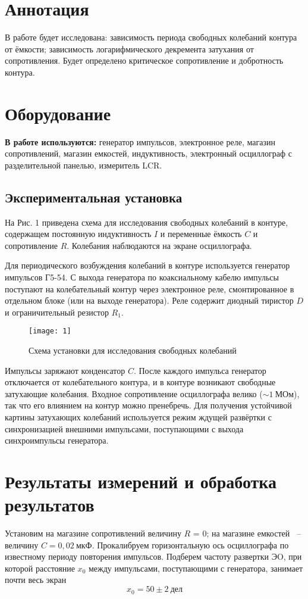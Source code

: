  


\section{Аннотация}
В работе будет исследована: зависимость
периода свободных колебаний контура от
ёмкости; зависимость логарифмического
декремента затухания от сопротивления.
Будет определено критическое
сопротивление и добротность контура.
\section{Оборудование}
\textbf{В работе используются:} генератор импульсов, электронное реле, магазин сопротивлений,
магазин емкостей, индуктивность, электронный осциллограф с разделительной панелью, измеритель
LCR.
\subsection*{Экспериментальная установка}
На Рис. 1 приведена схема для исследования свободных колебаний в контуре, содержащем постоянную
индуктивность $I$ и переменные ёмкость $C$ и сопротивление $R$. Колебания наблюдаются на экране
осциллографа.

Для периодического возбуждения колебаний в контуре используется генератор импульсов Г5-54. С выхода
генератора по коаксиальному кабелю импульсы поступают на колебательный контур через электронное
реле, смонтированное в отдельном блоке (или на выходе генератора). Реле содержит диодный тиристор
$D$ и ограничительный резистор $R_1$.
\begin{figure}[H]
    \texttt{[image: 1]}
    \captionsetup{justification =
    centering}
    \caption{Схема установки для
    исследования свободных колебаний}
\end{figure}
Импульсы заряжают конденсатор $C$. После
каждого импульса генератор отключается
от колебательного контура, и в контуре
возникают свободные затухающие
колебания. Входное сопротивление
осциллографа велико ($\sim 1\ \text{МОм}$), так что
его влиянием на контур можно пренебречь.
Для получения устойчивой картины
затухающих колебаний используется режим
ждущей развёртки с синхронизацией
внешними импульсами, поступающими с
выхода синхроимпульсы генератора. 

\section{Результаты измерений и обработка результатов}
Установим на магазине сопротивлений
величину $R$ = 0; на магазине емкостей~
-- величину $C = 0,02\ \text{мкФ}$.
Прокалибруем горизонтальную ось
осциллографа по известному периоду
повторения импульсов. Подберем частоту
развертки ЭO, при которой
расстояние $x_0$ между импульсами,
поступающими с генератора, занимает
почти весь экран
\[
    x_0 = 50\pm 2\ \text{дел}
\]

